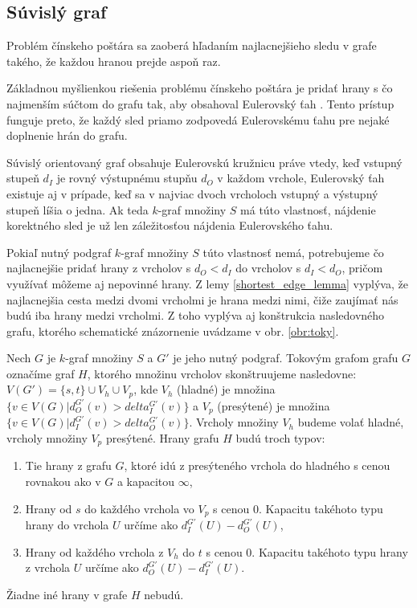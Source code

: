 \subsection{Súvislý graf}

Problém čínskeho poštára \cite{chinesepostman} sa zaoberá hľadaním najlacnejšieho sledu v grafe takého, že
každou hranou prejde aspoň raz.

Základnou myšlienkou riešenia problému čínskeho poštára je pridať hrany s čo najmenším súčtom do grafu
tak, aby obsahoval Eulerovský ťah \cite{chinesepostman}. Tento prístup funguje preto, že každý sled priamo
zodpovedá Eulerovskému ťahu pre nejaké doplnenie hrán do grafu.

Súvislý orientovaný graf obsahuje Eulerovskú kružnicu práve vtedy, keď vstupný stupeň $d_I$ je rovný
výstupnému stupňu $d_O$ v každom vrchole, Eulerovský ťah existuje aj v prípade, keď sa v najviac
dvoch vrcholoch vstupný a výstupný stupeň líšia o jedna. Ak teda $k$-graf množiny $S$ má túto
vlastnosť, nájdenie korektného sled je už len záležitosťou nájdenia Eulerovského ťahu.

Pokiaľ nutný podgraf $k$-graf množiny $S$ túto vlastnosť nemá, potrebujeme čo najlacnejšie pridať hrany z vrcholov s 
$d_O < d_I$ do vrcholov s $d_I < d_O$, pričom využívať môžeme aj nepovinné hrany.
Z lemy \ref{shortest_edge_lemma} vyplýva, že najlacnejšia cesta medzi dvomi vrcholmi je hrana medzi
nimi, čiže zaujímať nás budú iba hrany medzi vrcholmi. Z toho vyplýva aj konštrukcia nasledovného grafu,
ktorého schematické znázornenie uvádzame v obr. \ref{obr:toky}.

\begin{defn}
    Nech $G$ je $k$-graf množiny $S$ a $G'$ je jeho nutný podgraf. Tokovým grafom grafu $G$
    označíme graf $H$, ktorého množinu vrcholov skonštruujeme nasledovne:
    $V(G') = \{s, t\} \cup V_h \cup V_p$, kde $V_h$ (hladné) je množina $\{ v \in V(G) | d_O^{G'}(v) > delta_I^{G'}(v) \}$
    a $V_p$ (presýtené) je množina $\{ v \in V(G) | d_I^{G'}(v) > delta_O^{G'}(v)\}$. Vrcholy množiny $V_h$
    budeme volať hladné, vrcholy množiny $V_p$ presýtené.
    Hrany grafu $H$ budú troch typov:
    \begin{enumerate}
        \item Tie hrany z grafu $G$, ktoré idú z presýteného vrchola do hladného s cenou rovnakou ako v $G$ a kapacitou $\infty$,
        \item Hrany od $s$ do každého vrchola vo $V_p$ s cenou $0$. Kapacitu takéhoto typu hrany do vrchola $U$ určíme ako $d_I^{G'}(U) - d_O^{G'}(U)$,
        \item Hrany od každého vrchola z $V_h$ do $t$ s cenou $0$. Kapacitu takéhoto typu hrany z vrchola $U$ určíme ako $d_O^{G'}(U) - d_I^{G'}(U)$.
    \end{enumerate}
    Žiadne iné hrany v grafe $H$ nebudú.
\end{defn}

